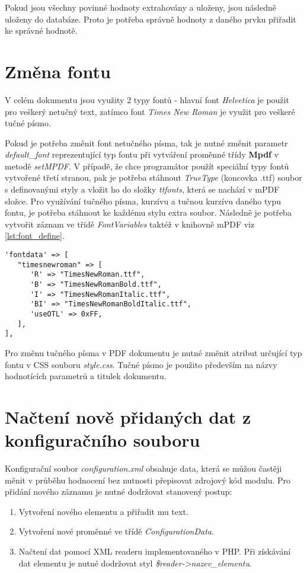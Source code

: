 \par
Pokud jsou všechny povinné hodnoty extrahovány a uloženy, jsou následně uloženy do databáze. Proto je potřeba správně hodnoty z daného prvku přiřadit ke správné hodnotě.

\section{Změna fontu}
V celém dokumentu jsou využity 2 typy fontů - hlavní font \textit{Helvetica} je použit pro veškerý netučný text, zatímco font \textit{Times New Roman} je využit pro veškeré tučné písmo.
\par
Pokud je potřeba změnit font netučného písma, tak je nutné změnit parametr \textit{default\_font} reprezentující typ fontu při vytváření proměnné třídy \textbf{Mpdf} v metodě \textit{setMPDF}. V případě, že chce programátor použít speciální typy fontů vytvořené třetí stranou, pak je potřeba stáhnout \textit{TrueType} (koncovka .ttf) soubor s definovanými styly a vložit ho do složky \textit{ttfonts}, která se nachází v mPDF složce. Pro využívání tučného písma, kurzívu a tučnou kurzívu daného typu fontu, je potřeba stáhnout ke každému stylu extra soubor. Následně je potřeba vytvořit záznam ve třídě \textit{FontVariables} taktéž v knihovně mPDF viz \ref{lst:font_define}.
\begin{lstlisting}[caption = {Nový záznam fontu v knihovně mPDF}, label = {lst:font_define}, captionpos=b]
'fontdata' => [
   "timesnewroman" => [
      'R' => "TimesNewRoman.ttf",
      'B' => "TimesNewRomanBold.ttf",
      'I' => "TimesNewRomanItalic.ttf",
      'BI' => "TimesNewRomanBoldItalic.ttf",
      'useOTL' => 0xFF,
   ],
],
\end{lstlisting}
\par
Pro změnu tučného písma v PDF dokumentu je nutné změnit atribut určující typ fontu v CSS souboru \textit{style.css}. Tučné písmo je použito především na názvy hodnotících parametrů a titulek dokumentu.

\section{Načtení nově přidaných dat z konfiguračního souboru}
Konfigurační soubor \textit{configuration.xml} obsahuje data, která se můžou častěji měnit v průběhu hodnocení bez nutnosti přepisovat zdrojový kód modulu. Pro přidání nového záznamu je nutné dodržovat stanovený postup:
\begin{enumerate}
	\item Vytvoření nového elementu a přiřadit mu text.
	\item Vytvoření nové proměnné ve třídě \textit{ConfigurationData}.
	\item Načtení dat pomocí XML readeru implementovaného v PHP. Při získávání dat elementu je nutné dodržovat styl \textit{\$reader->nazev\_elementu}. 
\end{enumerate}